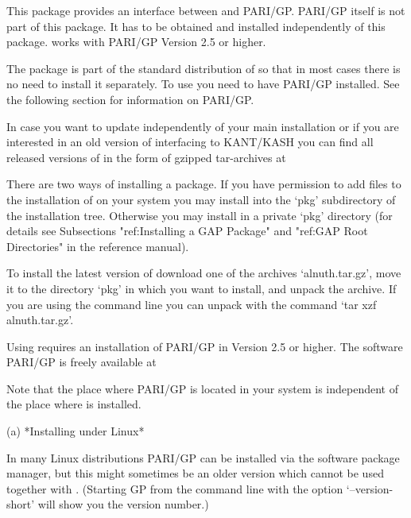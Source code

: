 

This package provides an interface between {\GAP} and PARI/GP. 
PARI/GP itself is not part of this package.  It has to be obtained and
installed independently of this package. {\Alnuth} works with PARI/GP
Version 2.5 or higher.


The package {\Alnuth} is part of the standard distribution of {\GAP} so that
in most cases there is no need to install it separately. To use {\Alnuth}
you need to have PARI/GP installed. See the following section for
information on PARI/GP.

In case you want to update {\Alnuth} independently of your main {\GAP}
installation or if you are interested in an old version of {\Alnuth}
interfacing to KANT/KASH you can find all released versions of {\Alnuth}
in the form of gzipped tar-archives at

There are two ways of installing a {\GAP} package. If you have
permission to add files to the installation of {\GAP} on your system
you may install {\Alnuth} into the `pkg' subdirectory of the {\GAP}
installation tree. Otherwise you may install {\Alnuth} in a private
`pkg' directory (for details see Subsections "ref:Installing a GAP
Package" and "ref:GAP Root Directories" in the {\GAP} reference manual).

To install the latest version of {\Alnuth} download one of
the archives `alnuth.tar.gz', move it to the
directory `pkg' in which you want to install, and unpack the
archive. If you are using the command line you can unpack with the
command `tar xzf alnuth.tar.gz'.

 
Using {\Alnuth} requires an installation of PARI/GP in Version 2.5 or
higher. The software PARI/GP is freely available at

Note that the place where PARI/GP is located in your system is
independent of the place where {\Alnuth} is installed.

\beginlist
\item{(a)} 
*Installing under Linux*

In many Linux distributions PARI/GP can be installed via the software
package manager, but this might sometimes be an older version which
cannot be used together with {\Alnuth}. (Starting GP from the command line
with the option `--version-short' will show you the version number.)

